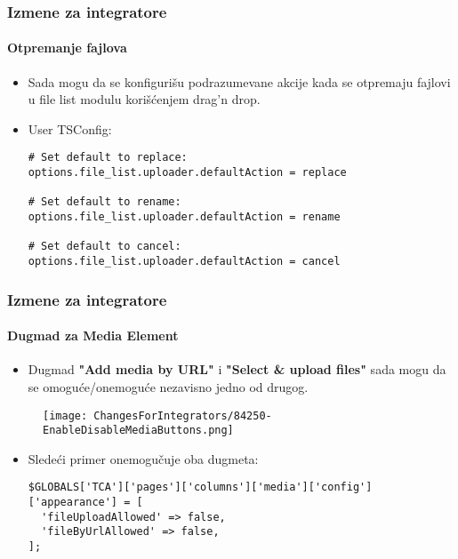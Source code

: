 
\begin{frame}[fragile]
	\frametitle{Izmene za integratore}
	\framesubtitle{Otpremanje fajlova}

	\lstset{basicstyle=\smaller\ttfamily}

	\begin{itemize}
		\item Sada mogu da se konfigurišu podrazumevane akcije kada se otpremaju fajlovi
		u file list modulu korišćenjem drag'n drop.
		\item User TSConfig:

\begin{lstlisting}
# Set default to replace:
options.file_list.uploader.defaultAction = replace

# Set default to rename:
options.file_list.uploader.defaultAction = rename

# Set default to cancel:
options.file_list.uploader.defaultAction = cancel
\end{lstlisting}

	\end{itemize}

\end{frame}


\begin{frame}[fragile]
	\frametitle{Izmene za integratore}
	\framesubtitle{Dugmad za Media Element}

	\lstset{basicstyle=\tiny\ttfamily}

	\begin{itemize}
		\item Dugmad \textbf{"Add media by URL"} i \textbf{"Select \& upload files"}
			 sada mogu da se omoguće/onemoguće nezavisno jedno od drugog.
	\end{itemize}

	\begin{figure}
		\texttt{[image: ChangesForIntegrators/84250-EnableDisableMediaButtons.png]}
	\end{figure}

	\begin{itemize}
		\item Sledeći primer onemogučuje oba dugmeta:

\begin{lstlisting}
$GLOBALS['TCA']['pages']['columns']['media']['config']['appearance'] = [
  'fileUploadAllowed' => false,
  'fileByUrlAllowed' => false,
];
\end{lstlisting}

	\end{itemize}

\end{frame}

